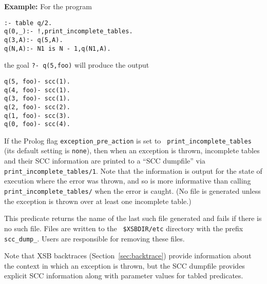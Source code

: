 \begin{description}
{\bf Example:} For the program
%
\begin{verbatim}
:- table q/2.
q(0,_):- !,print_incomplete_tables.
q(3,A):- q(5,A).
q(N,A):- N1 is N - 1,q(N1,A).
\end{verbatim}
the goal {\tt ?- q(5,foo)} will produce the output 
%
{\small
\begin{verbatim}
q(5, foo)- scc(1).
q(4, foo)- scc(1).
q(3, foo)- scc(1).
q(2, foo)- scc(2).
q(1, foo)- scc(3).
q(0, foo)- scc(4).
\end{verbatim}
}
%

%
If the Prolog flag {\tt exception\_pre\_action} is set to {\tt
  print\_incomplete\_tables} (its default setting is {\tt none}), then
when an exception is thrown, incomplete tables and their SCC
information are printed to a ``SCC dumpfile'' via {\tt
  print\_incomplete\_tables/1}.  Note that the information is output
for the state of execution where the error was thrown, and so is more
informative than calling {\tt print\_incomplete\_tables/} when the
error is caught.  (No file is generated unless the exception is thrown
over at least one incomplete table.)

This predicate returns the name of the last such file generated and
fails if there is no such file.  Files are written to the {\tt
  \$XSBDIR/etc} directory with the prefix {\tt scc\_dump\_}.  Users
are responsible for removing these files.

Note that XSB backtraces (Section~\ref{sec:backtrace}) provide
information about the context in which an exception is thrown, but the
SCC dumpfile provides explicit SCC information along with parameter
values for tabled predicates.


\end{description}
